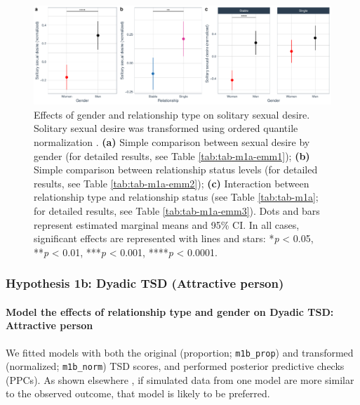 \documentclass[
  bookmarksnumbered]{article}
\begin{document}
\begin{figure}
\centering
\includegraphics{Sexual_Desire_Arousal_V2_files/figure-latex/fig-h1a-1.pdf}
\caption{\label{fig:fig-h1a}Effects of gender and relationship type on solitary sexual desire. Solitary sexual desire was transformed using ordered quantile normalization \autocite{petersonOrderedQuantileNormalization2020a}. \textbf{(a)} Simple comparison between sexual desire by gender (for detailed results, see Table \ref{tab:tab-m1a-emm1}); \textbf{(b)} Simple comparison between relationship status levels (for detailed results, see Table \ref{tab:tab-m1a-emm2}); \textbf{(c)} Interaction between relationship type and relationship status (see Table \ref{tab:tab-m1a}; for detailed results, see Table \ref{tab:tab-m1a-emm3}). Dots and bars represent estimated marginal means and 95\% CI. In all cases, significant effects are represented with lines and stars: *\emph{p} \textless{} 0.05, **\emph{p} \textless{} 0.01, ***\emph{p} \textless{} 0.001, ****\emph{p} \textless{} 0.0001.}
\end{figure}

\subsubsection{Hypothesis 1b: Dyadic TSD (Attractive person)}\label{hypothesis1b}

\paragraph{Model the effects of relationship type and gender on Dyadic TSD: Attractive person}\label{model-the-effects-of-relationship-type-and-gender-on-dyadic-tsd-attractive-person}

We fitted models with both the original (proportion; \texttt{m1b\_prop}) and transformed (normalized; \texttt{m1b\_norm}) TSD scores, and performed posterior predictive checks (PPCs). As shown elsewhere \autocite[e.g.,][]{gabryVisualizationBayesianWorkflow2019}, if simulated data from one model are more similar to the observed outcome, that model is likely to be preferred.
\end{document}
